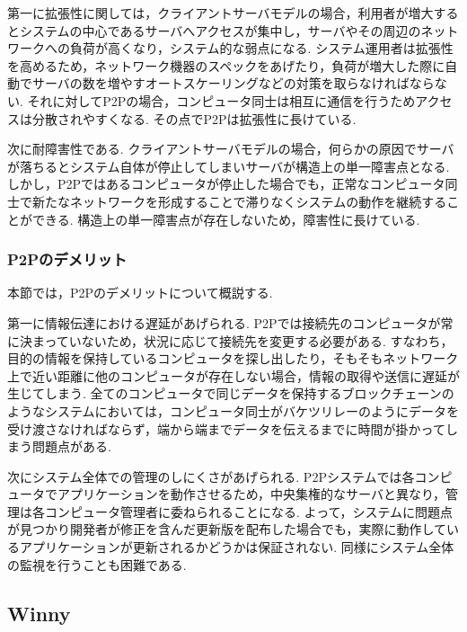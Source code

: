 第一に拡張性に関しては，クライアントサーバモデルの場合，利用者が増大するとシステムの中心であるサーバへアクセスが集中し，サーバやその周辺のネットワークへの負荷が高くなり，システム的な弱点になる.
システム運用者は拡張性を高めるため，ネットワーク機器のスペックをあげたり，負荷が増大した際に自動でサーバの数を増やすオートスケーリングなどの対策を取らなければならない.
それに対してP2Pの場合，コンピュータ同士は相互に通信を行うためアクセスは分散されやすくなる.
その点でP2Pは拡張性に長けている.

次に耐障害性である.
クライアントサーバモデルの場合，何らかの原因でサーバが落ちるとシステム自体が停止してしまいサーバが構造上の単一障害点となる.
しかし，P2Pではあるコンピュータが停止した場合でも，正常なコンピュータ同士で新たなネットワークを形成することで滞りなくシステムの動作を継続することができる.
構造上の単一障害点が存在しないため，障害性に長けている.

\subsubsection{P2Pのデメリット}

本節では，P2Pのデメリットについて概説する.

第一に情報伝達における遅延があげられる.
P2Pでは接続先のコンピュータが常に決まっていないため，状況に応じて接続先を変更する必要がある.
すなわち，目的の情報を保持しているコンピュータを探し出したり，そもそもネットワーク上で近い距離に他のコンピュータが存在しない場合，情報の取得や送信に遅延が生じてしまう.
全てのコンピュータで同じデータを保持するブロックチェーンのようなシステムにおいては，コンピュータ同士がバケツリレーのようにデータを受け渡さなければならず，端から端までデータを伝えるまでに時間が掛かってしまう問題点がある.

次にシステム全体での管理のしにくさがあげられる.
P2Pシステムでは各コンピュータでアプリケーションを動作させるため，中央集権的なサーバと異なり，管理は各コンピュータ管理者に委ねられることになる.
よって，システムに問題点が見つかり開発者が修正を含んだ更新版を配布した場合でも，実際に動作しているアプリケーションが更新されるかどうかは保証されない.
同様にシステム全体の監視を行うことも困難である.

\subsection{Winny}

